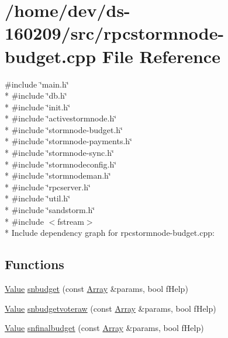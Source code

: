 \hypertarget{rpcstormnode-budget_8cpp}{}\section{/home/dev/ds-\/160209/src/rpcstormnode-\/budget.cpp File Reference}
\label{rpcstormnode-budget_8cpp}
{\ttfamily \#include \char`\"{}main.\+h\char`\"{}}\\*
{\ttfamily \#include \char`\"{}db.\+h\char`\"{}}\\*
{\ttfamily \#include \char`\"{}init.\+h\char`\"{}}\\*
{\ttfamily \#include \char`\"{}activestormnode.\+h\char`\"{}}\\*
{\ttfamily \#include \char`\"{}stormnode-\/budget.\+h\char`\"{}}\\*
{\ttfamily \#include \char`\"{}stormnode-\/payments.\+h\char`\"{}}\\*
{\ttfamily \#include \char`\"{}stormnode-\/sync.\+h\char`\"{}}\\*
{\ttfamily \#include \char`\"{}stormnodeconfig.\+h\char`\"{}}\\*
{\ttfamily \#include \char`\"{}stormnodeman.\+h\char`\"{}}\\*
{\ttfamily \#include \char`\"{}rpcserver.\+h\char`\"{}}\\*
{\ttfamily \#include \char`\"{}util.\+h\char`\"{}}\\*
{\ttfamily \#include \char`\"{}sandstorm.\+h\char`\"{}}\\*
{\ttfamily \#include $<$fstream$>$}\\*
Include dependency graph for rpcstormnode-\/budget.cpp\+:
\subsection*{Functions}
\begin{DoxyCompactItemize}
\item 
\hyperlink{namespacejson__spirit_a28e6abc99fda7b06c430ca38802527a3}{Value} \hyperlink{rpcstormnode-budget_8cpp_aae19bf2ba52f3b864bfaf70206bcb29a}{snbudget} (const \hyperlink{namespacejson__spirit_aee299e52bda3816039a53210cbbfea1a}{Array} \&params, bool f\+Help)
\item 
\hyperlink{namespacejson__spirit_a28e6abc99fda7b06c430ca38802527a3}{Value} \hyperlink{rpcstormnode-budget_8cpp_a0ed276908ef20f9b0ed87c3ed4c26d25}{snbudgetvoteraw} (const \hyperlink{namespacejson__spirit_aee299e52bda3816039a53210cbbfea1a}{Array} \&params, bool f\+Help)
\item 
\hyperlink{namespacejson__spirit_a28e6abc99fda7b06c430ca38802527a3}{Value} \hyperlink{rpcstormnode-budget_8cpp_aaff1bdc7f9f32708efc9094bb6ab0e0d}{snfinalbudget} (const \hyperlink{namespacejson__spirit_aee299e52bda3816039a53210cbbfea1a}{Array} \&params, bool f\+Help)
\end{DoxyCompactItemize}


